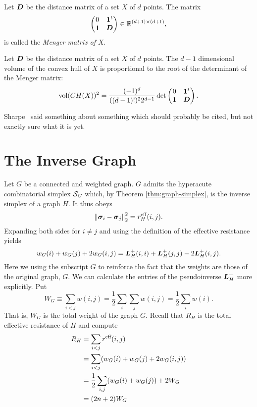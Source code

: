 Let $\vb*{D}$ be the distance matrix of a set $X$ of $d$ points. The matrix 
\begin{equation}
\label{eq:menger_matrix}
\begin{pmatrix}
0 & \vb{1}^t \\
\vb{1} & \vb*{D}
\end{pmatrix}\in\mathbb{R}^{(d+1)\times (d+1)},
\end{equation}
is called the \emph{Menger matrix of $X$}. 

\begin{lemma}
	Let $\vb*{D}$ be the distance matrix of a set $X$ of $d$ points. The $d-1$ dimensional volume of the convex hull of $X$ is proportional to the root of the determinant of the Menger matrix: 
	\begin{equation*}
	\textnormal{vol}(CH(X))^2 = \frac{(-1)^d}{((d-1)!)^2 2^{d-1}} \det\begin{pmatrix}
	0 & \vb{1}^t \\
	\vb{1} & \vb*{D}
	\end{pmatrix}.
	\end{equation*} 
\end{lemma}

Sharpe~\cite{sharpe1967theorem} said something about something which should probably be cited, but not exactly sure what it is yet. 



\section{The Inverse Graph}
Let $G$ be a connected and weighted graph. $G$ admits the hyperacute combinatorial simplex $\mathcal{S}_G$ which, by Theorem \ref{thm:graph-simplex}, is the inverse simplex of a graph $H$. It thus obeys 
\begin{equation*}
\norm{\vb*{\sigma}_i-\vb*{\sigma}_j}_2^2 = r^{\text{eff}}_H(i,j). 
\end{equation*}
Expanding both sides for $i\neq j$ and  using the definition of the effective resistance yields 
\begin{equation*}
w_G(i) + w_G(j) + 2w_G(i,j) = \vb*{L}_H^+(i,i) + \vb*{L}_H^+(j,j) -2\vb*{L}_H^+(i,j). 
\end{equation*}
Here we using the subscript $G$ to reinforce the fact that the weights are those of the original graph, $G$. We can calculate the entries of the pseudoinverse $\vb*{L}_H^+$ more explicitly. Put 
\[W_G\equiv \sum_{i<j}w(i,j) = \frac{1}{2}\sum_i \sum_j w(i,j) = \frac{1}{2}\sum_i w(i).\]
That is, $W_G$ is the total weight of the graph $G$. Recall that $R_H$ is the total effective resistance of $H$ and compute 
\begin{align*}
R_H &= \sum_{i<j} r^{\text{eff}}(i,j) \\
&= \sum_{i<j} (w_G(i) + w_G(j) + 2w_G(i,j)) \\
&= \frac{1}{2}\sum_{i,j} (w_G(i) +w_G(j)) + 2W_G \\
&= (2n+2)W_G 
\end{align*}

